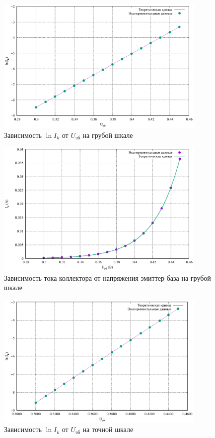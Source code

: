 \begin{figure}[ht!]
\centering
\includegraphics[width=0.9\textwidth]{diode_ln_curve.eps}
\caption{Зависимость $\ln I_k$ от $U_{\text{эб}}$ на грубой шкале}
\label{fig:plot}
\end{figure}

\begin{figure}[ht!]
\centering
\includegraphics[width=0.9\textwidth]{diode_curve.eps}
\caption{Зависимость тока коллектора от напряжения эмиттер-база на грубой шкале}
\label{fig:plot}
\end{figure}

\begin{figure}[ht!]
\centering
\includegraphics[width=0.9\textwidth]{diode_ln_curve1.eps}
\caption{Зависимость $\ln I_k$ от $U_{\text{эб}}$ на точной шкале}
\label{fig:plot}
\end{figure}

